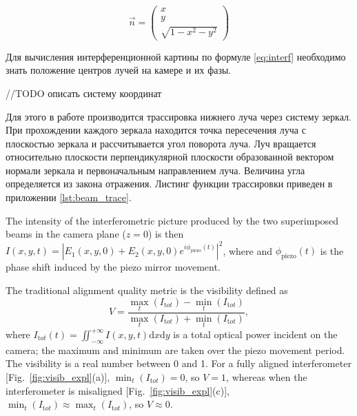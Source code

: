 \begin{equation}
    \vec{n} = \begin{pmatrix}
        x\\ 
        y\\ 
        \sqrt{1 - x^2 - y^2}
    \end{pmatrix}
\end{equation}


Для вычисления интерференционной картины по формуле \ref{eq:interf} необходимо знать положение центров лучей на камере и их фазы. 

//TODO описать систему координат

Для этого в работе производится трассировка нижнего луча через систему зеркал. При прохождении каждого зеркала находится точка пересечения луча с плоскостью зеркала и рассчитывается угол поворота луча. Луч вращается относительно плоскости перпендикулярной плоскости образованной вектором нормали зеркала и первоначальным направлением луча. Величина угла определяется из закона отражения. Листинг функции трассировки приведен в приложении \ref{lst:beam_trace}.

The intensity of the interferometric picture produced by the two superimposed beams in the camera plane ($z=0$) is then  $I(x,y,t)=|E_1(x,y,0)+E_2(x,y,0)e^{i\phi_{\mathrm{piezo}}(t)}|^2$, where  and $\phi_{\mathrm{piezo}}(t)$ is the phase shift induced by the piezo mirror movement.%

The traditional alignment quality metric is the visibility defined as 
\begin{equation}
    V = \frac{            \max_{t}(I_{\mathrm tot}) - \min_t(I_{\mathrm tot})
            } {
                \max_{t}(I_{\mathrm tot}) + \min_t(I_{\mathrm tot})
            },
    \label{eq:visib}
\end{equation}
where $I_{\mathrm tot}(t) = \iint_{-\infty}^{+\infty} I(x, y, t) {\mathrm d}x{\mathrm d}y$ is a total optical power incident on the camera; the maximum and minimum are taken over the piezo movement period. The visibility is a real number between 0 and 1. For a fully aligned interferometer [Fig.~\ref{fig:visib_expl}(a)], $\min_t(I_{\mathrm tot})=0$, so $V=1$, whereas when the interferometer is misaligned [Fig.~\ref{fig:visib_expl}(c)], $\min_t(I_{\mathrm tot})\approx\max_t(I_{\mathrm tot})$, so $V\approx 0$.

